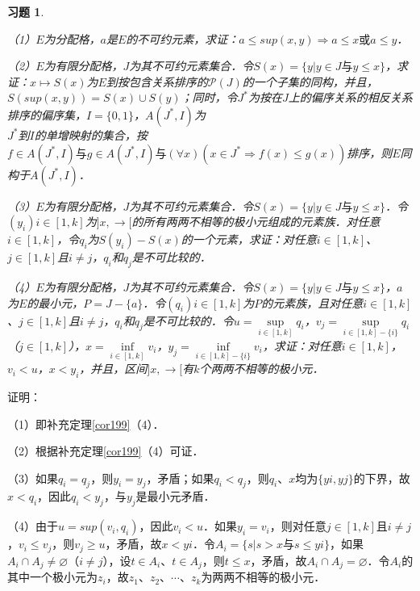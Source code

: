 \documentclass[12pt, a4paper, oneside]{book}
\newtheorem{exer}{习题}
\begin{document}
			\begin{exer}\label{exer134}
				\hfill\par
				（1）$E$为分配格，$a$是$E$的不可约元素，求证：$a\leq sup(x, y)\Rightarrow a\leq x\text{或}a\leq y$．
				\par
				（2）$E$为有限分配格，$J$为其不可约元素集合．令$S(x)=\{y|y\in J\text{与}y\leq x\}$，求证：$x\mapsto S(x)$为$E$到按包含关系排序的$\mathcal{P}(J)$的一个子集的同构，并且，$S(sup(x, y))=S(x)\cup S(y)$；同时，令$J^*$为按在$J$上的偏序关系的相反关系排序的偏序集，$I=\{0, 1\}$，$A(J^*, I)$为\\$J^*$到$I$的单增映射的集合，按$f\in A(J^*, I)\text{与}g\in A(J^*, I)\text{与}(\forall x)(x\in J^*\Rightarrow f(x)\leq g(x))$排序，则$E$同构于$A(J^*, I)$．
				\par
				（3）$E$为有限分配格，$J$为其不可约元素集合．令$S(x)=\{y|y\in J\text{与}y\leq x\}$．令$(y_i)i\in [1, k]$为$]x, \to [$的所有两两不相等的极小元组成的元素族．对任意$i\in [1, k]$，令$q_i$为$S(y_i)-S(x)$的一个元素，求证：对任意$i\in [1, k]$、$j\in [1, k]$且$i\neq j$，$q_i$和$q_j$是不可比较的．
				\par
				（4）$E$为有限分配格，$J$为其不可约元素集合．令$S(x)=\{y|y\in J\text{与}y\leq x\}$，$a$为$E$的最小元，$P=J-\{a\}$．令$(q_i)i\in [1, k]$为$P$的元素族，且对任意$i\in [1, k]$、$j\in [1, k]$且$i\neq j$，$q_i$和$q_j$是不可比较的．令$u=\mathop{sup}\limits_{i\in [1, k]}q_i$，$v_j=\mathop{sup}\limits_{i\in [1, k]-\{i\}}q_i$（$j\in [1, k]$），$x=\mathop{inf}\limits_{i\in [1, k]}v_i$，$y_j=\mathop{inf}\limits_{i\in [1, k]-\{i\}}v_i$，求证：对任意$i\in [1, k]$，$v_i<u$，$x<y_i$，并且，区间$]x, \to [$有$k$个两两不相等的极小元．
			\end{exer}
			证明：
			\par
			（1）即补充定理\ref{cor199}（4）．
			\par
			（2）根据补充定理\ref{cor199}（4）可证．
			\par
			（3）如果$q_i=q_j$，则$y_i=y_j$，矛盾；如果$q_i<q_j$，则$q_i$、$x$均为$\{yi, yj\}$的下界，故$x<q_i$，因此$q_i<y_j$，与$y_j$是最小元矛盾．
			\par
			（4）由于$u=sup(v_i, q_i)$，因此$v_i<u$．如果$y_i=v_i$，则对任意$j\in [1, k]$且$i\neq j$，$v_i\leq v_j$，则$v_j\geq u$，矛盾，故$x<yi$．令$A_i=\{s|s>x\text{与}s\leq yi\}$，如果$A_i\cap A_j\neq \varnothing$（$i\neq j$），设$t\in A_i$、$t\in A_j$，则$t\leq x$，矛盾，故$A_i\cap A_j=\varnothing$．令$A_i$的其中一个极小元为$z_i$，故$z_1$、$z_2$、$\cdots$、$z_k$为两两不相等的极小元．
			
\end{document}
